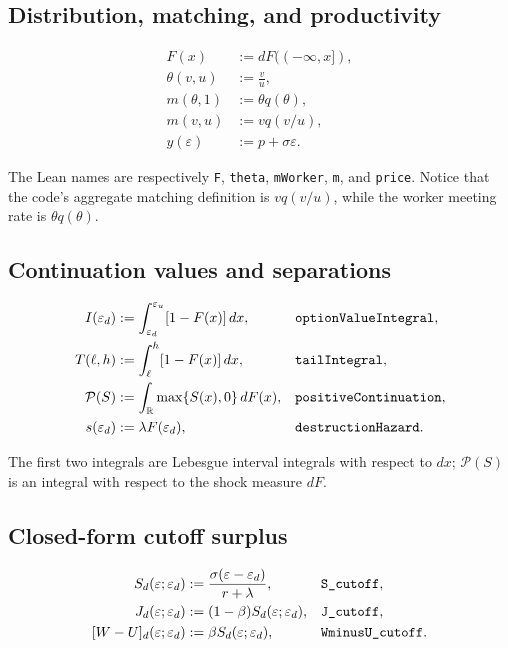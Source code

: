 \documentclass[11pt]{article}
\newcommand{\code}[1]{\texttt{#1}}
\newcommand{\epsd}{\varepsilon_d}
\newcommand{\epsu}{\varepsilon_u}
\newcommand{\mworker}[1]{m(#1,1)}
\begin{document}
\subsection{Distribution, matching, and productivity}

\begin{align*}
F(x) &:= dF(({-\infty},x]), \\
\theta(v,u) &:= \frac vu, \\
\mworker{\theta} &:= \theta q(\theta), \\
m(v,u) &:= vq(v/u), \\
y(\varepsilon) &:= p+\sigma\varepsilon.
\end{align*}

The Lean names are respectively \code{F}, \code{theta}, \code{mWorker}, \code{m},
and \code{price}. Notice that the code's aggregate matching definition is
$v q(v/u)$, while the worker meeting rate is $\theta q(\theta)$.

\subsection{Continuation values and separations}

\begin{align*}
I(\epsd) &:= \int_{\epsd}^{\epsu}[1-F(x)]\,dx,
&&\text{\code{optionValueIntegral}},\\
T(\ell,h) &:= \int_{\ell}^{h}[1-F(x)]\,dx,
&&\text{\code{tailIntegral}},\\
\mathcal P(S) &:= \int_{\mathbb R}\max\{S(x),0\}\,dF(x),
&&\text{\code{positiveContinuation}},\\
s(\epsd) &:= \lambda F(\epsd),
&&\text{\code{destructionHazard}}.
\end{align*}

The first two integrals are Lebesgue interval integrals with respect to $dx$;
$\mathcal P(S)$ is an integral with respect to the shock measure $dF$.

\subsection{Closed-form cutoff surplus}

\begin{align*}
S_d(\varepsilon;\epsd)
  &:= \frac{\sigma(\varepsilon-\epsd)}{r+\lambda},
  &&\text{\code{S\_cutoff}},\\
J_d(\varepsilon;\epsd)
  &:= (1-\beta)S_d(\varepsilon;\epsd),
  &&\text{\code{J\_cutoff}},\\
[W-U]_d(\varepsilon;\epsd)
  &:= \beta S_d(\varepsilon;\epsd),
  &&\text{\code{WminusU\_cutoff}}.
\end{align*}
\end{document}
